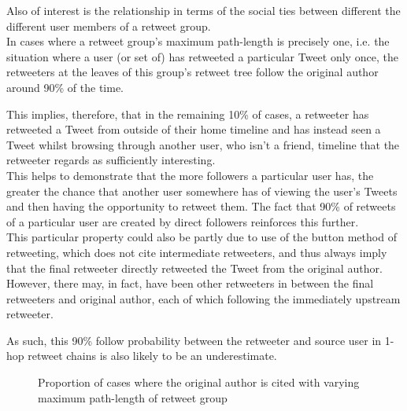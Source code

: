 Also of interest is the relationship in terms of the social ties between different the different user members of a retweet group.\\
In cases where a retweet group's maximum path-length is precisely one, i.e. the situation where a user (or set of) has retweeted a particular Tweet only once, the retweeters at the leaves of this group's retweet tree follow the original author around 90\% of the time.

This implies, therefore, that in the remaining 10\% of cases, a retweeter has retweeted a Tweet from outside of their home timeline and has instead seen a Tweet whilst browsing through another user, who isn't a friend, timeline that the retweeter regards as sufficiently interesting.\\
This helps to demonstrate that the more followers a particular user has, the greater the chance that another user somewhere has of viewing the user's Tweets and then having the opportunity to retweet them. The fact that 90\% of retweets of a particular user are created by direct followers reinforces this further.\\
This particular property could also be partly due to use of the button method of retweeting, which does not cite intermediate retweeters, and thus always imply that the final retweeter directly retweeted the Tweet from the original author. However, there may, in fact, have been other retweeters in between the final retweeters and original author, each of which following the immediately upstream retweeter.

As such, this 90\% follow probability between the retweeter and source user in 1-hop retweet chains is also likely to be an underestimate.

\begin{figure}[h]
\centering
    \caption{Proportion of cases where the original author is cited with varying maximum path-length of retweet group}
\label{fig:citation-pathlength}
\end{figure}

